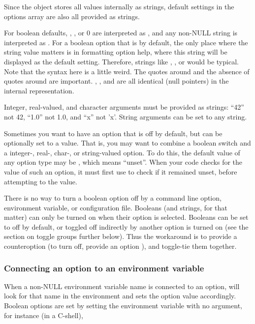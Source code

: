 Since the  object stores all values internally as
strings, default settings in the options array are also all provided
as strings.

For boolean defaults, , , or 0 are
interpreted as , and any non-NULL string is interpreted
as .  For a boolean option that is  by
default, the only place where the string value matters is in
formatting option help, where this string will be displayed as the
default setting. Therefore, strings like ,
, or  would be typical. Note that the syntax
here is a little weird. The quotes around  and the
absence of quotes around  are important. ,
, and  are all identical (null pointers) in the
internal representation.

Integer, real-valued, and character arguments must be provided as
strings: ``42'' not 42, ``1.0'' not 1.0, and ``x'' not 'x'.  String
arguments can be set to any string.

Sometimes you want to have an option that is off by default, but can
be optionally set to a value. That is, you may want to combine a
boolean switch and a integer-, real-, char-, or string-valued
option. To do this, the default value of any option type may be
, which means ``unset''. When your code checks for the
value of such an option, it must first use
 to check if it remained unset, before
attempting to  the value.

There is no way to turn a boolean option off by a command line option,
environment variable, or configuration file. Booleans (and strings,
for that matter) can only be turned on when their option is
selected. Booleans can be set to off by default, or toggled off
indirectly by another option is turned on (see the section on toggle
groups further below). Thus the workaround is to provide a
counteroption (to turn  off, provide an option
), and toggle-tie them together.



   \subsubsection{Connecting an option to an environment variable}

When a non-NULL environment variable name is connected to an option,
 will look for that name in the
environment and sets the option value accordingly. Boolean options are
set by setting the environment variable with no argument, for instance
(in a C-shell),

